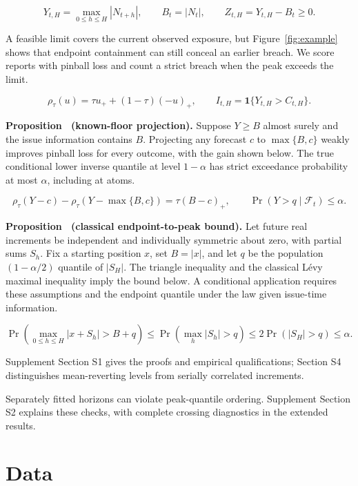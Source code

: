 \documentclass[11pt,a4paper]{article}
\newcounter{proposition}
\begin{document}
\[
Y_{t,H}=\max_{0\le h\le H}|N_{t+h}|,\qquad B_t=|N_t|,\qquad Z_{t,H}=Y_{t,H}-B_t\ge0.
\]

A feasible limit covers the current observed exposure, but Figure~\ref{fig:example} shows that endpoint containment can still conceal an earlier breach. We score reports with pinball loss and count a strict breach when the peak exceeds the limit.


\[
\rho_\tau(u)=\tau u_+ +(1-\tau)(-u)_+,\qquad I_{t,H}=\mathbf 1\{Y_{t,H}>C_{t,H}\}.
\]

\noindent\textbf{Proposition~\theproposition{} (known-floor projection).}\label{prop:floor} Suppose \(Y\ge B\) almost surely and the issue information contains \(B\). Projecting any forecast \(c\) to \(\max\{B,c\}\) weakly improves pinball loss for every outcome, with the gain shown below. The true conditional lower inverse quantile at level \(1-\alpha\) has strict exceedance probability at most \(\alpha\), including at atoms.


\[
\rho_\tau(Y-c)-\rho_\tau(Y-\max\{B,c\})=\tau(B-c)_+,\qquad \Pr(Y>q\mid\mathcal F_t)\le\alpha.
\]

\noindent\textbf{Proposition~\theproposition{} (classical endpoint-to-peak bound).}\label{prop:levy} Let future real increments be independent and individually symmetric about zero, with partial sums \(S_h\). Fix a starting position \(x\), set \(B=|x|\), and let \(q\) be the population \((1-\alpha/2)\) quantile of \(|S_H|\). The triangle inequality and the classical L\'evy maximal inequality imply the bound below. A conditional application requires these assumptions and the endpoint quantile under the law given issue-time information.


\[
\Pr\!\left(\max_{0\le h\le H}|x+S_h|>B+q\right)\le\Pr\!\left(\max_h|S_h|>q\right)\le2\Pr(|S_H|>q)\le\alpha.
\]

Supplement Section S1 gives the proofs and empirical qualifications; Section S4 distinguishes mean-reverting levels from serially correlated increments.


Separately fitted horizons can violate peak-quantile ordering. Supplement Section S2 explains these checks, with complete crossing diagnostics in the extended results.


\FloatBarrier

\section{Data}\label{sec:data}
\end{document}
